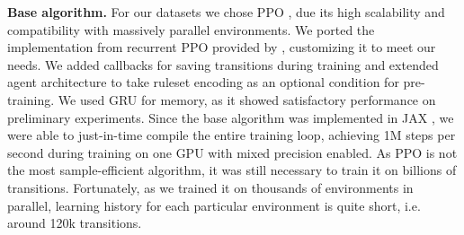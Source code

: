 \documentclass{article}
\begin{document}

\textbf{Base algorithm.}
For our datasets we chose PPO \citep{schulman2017proximal}, due its high scalability and compatibility with massively parallel environments. We ported the implementation from recurrent PPO provided by \citep{nikulin2023xland}, customizing it to meet our needs. We added callbacks for saving transitions during training and extended agent architecture to take ruleset encoding as an optional condition for pre-training. We used GRU \citep{cho2014properties} for memory, as it showed satisfactory performance on preliminary experiments. Since the base algorithm was implemented in JAX \citep{jax2018github}, we were able to just-in-time compile the entire training loop, achieving 1M steps per second during training on one GPU with mixed precision enabled. As PPO is not the most sample-efficient algorithm, it was still necessary to train it on billions of transitions. Fortunately, as we trained it on thousands of environments in parallel, learning history for each particular environment is quite short, i.e. around 120k transitions.

\end{document}
